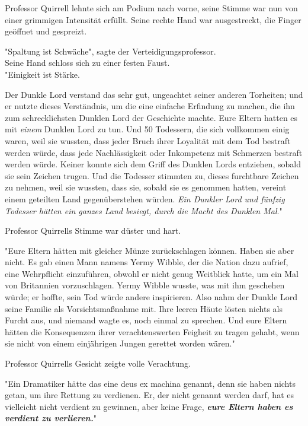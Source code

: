 {Professor Quirrell lehnte sich am Podium nach vorne, seine Stimme war nun von einer grimmigen Intensität erfüllt. Seine rechte Hand war ausgestreckt, die Finger geöffnet und gespreizt.

"Spaltung ist Schwäche", sagte der Verteidigungsprofessor.\\ Seine Hand schloss sich zu einer festen Faust.\\ "Einigkeit ist Stärke.

Der Dunkle Lord verstand das sehr gut, ungeachtet seiner anderen Torheiten; und er nutzte dieses Verständnis, um die eine einfache Erfindung zu machen, die ihn zum schrecklichsten Dunklen Lord der Geschichte machte. Eure Eltern hatten es mit \emph{einem} Dunklen Lord zu tun. Und 50 Todessern, die sich vollkommen einig waren, weil sie wussten, dass jeder Bruch ihrer Loyalität mit dem Tod bestraft werden würde, dass jede Nachlässigkeit oder Inkompetenz mit Schmerzen bestraft werden würde. Keiner konnte sich dem Griff des Dunklen Lords entziehen, sobald sie sein Zeichen trugen. Und die Todesser stimmten zu, dieses furchtbare Zeichen zu nehmen, weil sie wussten, dass sie, sobald sie es genommen hatten, vereint einem geteilten Land gegenüberstehen würden. \emph{Ein Dunkler Lord und fünfzig Todesser hätten ein ganzes Land besiegt, durch die Macht des Dunklen Mal}."

Professor Quirrells Stimme war düster und hart.

"Eure Eltern hätten mit gleicher Münze zurückschlagen können. Haben sie aber nicht. Es gab einen Mann namens Yermy Wibble, der die Nation dazu aufrief, eine Wehrpflicht einzuführen, obwohl er nicht genug Weitblick hatte, um ein Mal von Britannien vorzuschlagen. Yermy Wibble wusste, was mit ihm geschehen würde; er hoffte, sein Tod würde andere inspirieren. Also nahm der Dunkle Lord seine Familie als Vorsichtsmaßnahme mit. Ihre leeren Häute lösten nichts als Furcht aus, und niemand wagte es, noch einmal zu sprechen. Und eure Eltern hätten die Konsequenzen ihrer verachtenswerten Feigheit zu tragen gehabt, wenn sie nicht von einem einjährigen Jungen gerettet worden wären."

Professor Quirrells Gesicht zeigte volle Verachtung.

"Ein Dramatiker hätte das eine deus ex machina genannt, denn sie haben nichts getan, um ihre Rettung zu verdienen. Er, der nicht genannt werden darf, hat es vielleicht nicht verdient zu gewinnen, aber keine Frage, \textbf{\emph{eure Eltern haben es verdient zu verlieren.}}"

}
